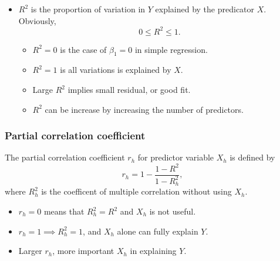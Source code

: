 \begin{refsection}
\begin{remark}\hfill
	\begin{itemize}
		\item $R^2$ is  the proportion of variation in $Y$ explained by the predicator $X$. Obviously, 
		$$0\leq R^2 \leq 1.$$
		\begin{itemize}
			\item $R^2 = 0$ is the case of $\beta_1=0$ in simple regression.
			\item $R^2 = 1$ is all variations is explained by $X$.
			\item Large $R^2$ implies small residual, or good fit.
			\item $R^2$ can be increase by increasing the number of predictors. 
		\end{itemize}
	\end{itemize}
\end{remark}


\subsubsection{Partial correlation coefficient}
\begin{definition}\cite[173]{theil1971principles}
The partial correlation coefficient $r_h$ for predictor variable $X_h$ is defined by	
	$$r_h = 1 - \frac{1-R^2}{1-R^2_h},$$
	where $R^2_h$ is the coefficent of multiple correlation without using $X_h$.	
\end{definition}


\begin{remark}\hfill
\begin{itemize}
	\item $r_h = 0$ means that $R_h^2 = R^2$ and $X_h$ is not useful.
	\item $r_h = 1 \implies R_h^2 = 1$, and $X_h$ alone can fully explain $Y$.
	\item Larger $r_h$, more important $X_h$ in explaining $Y$.
\end{itemize}	
\end{remark}




\end{refsection}
